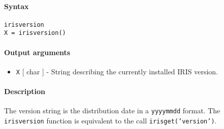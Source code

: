 


	\paragraph{Syntax}

\begin{verbatim}
irisversion
X = irisversion()
\end{verbatim}

\paragraph{Output arguments}

\begin{itemize}
\itemsep1pt\parskip0pt
\item
  \texttt{X} {[} char {]} - String describing the currently installed
  IRIS version.
\end{itemize}

\paragraph{Description}

The version string is the distribution date in a \texttt{yyyymmdd}
format. The \texttt{irisversion} function is equivalent to the call
\texttt{irisget('version')}.


